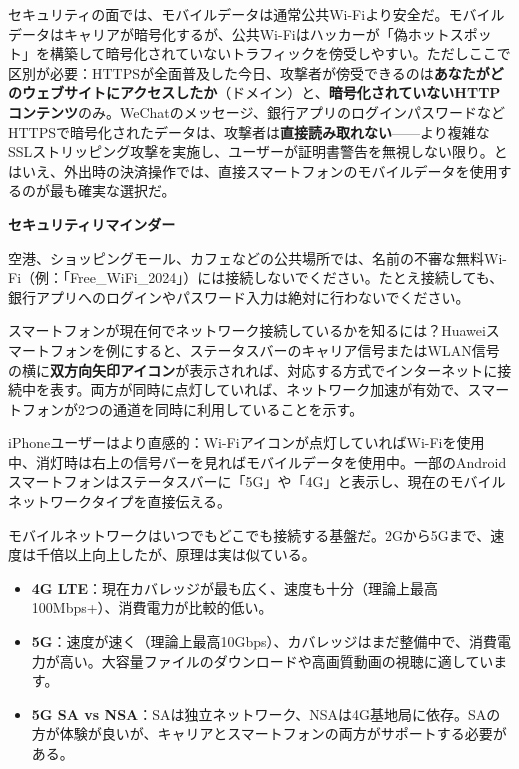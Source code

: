 
セキュリティの面では、モバイルデータは通常公共Wi-Fiより安全だ。モバイルデータはキャリアが暗号化するが、公共Wi-Fiはハッカーが「偽ホットスポット」を構築して暗号化されていないトラフィックを傍受しやすい。ただしここで区別が必要：HTTPSが全面普及した今日、攻撃者が傍受できるのは\textbf{あなたがどのウェブサイトにアクセスしたか}（ドメイン）と、\textbf{暗号化されていないHTTPコンテンツ}のみ。WeChatのメッセージ、銀行アプリのログインパスワードなどHTTPSで暗号化されたデータは、攻撃者は\textbf{直接読み取れない}——より複雑なSSLストリッピング攻撃を実施し、ユーザーが証明書警告を無視しない限り。とはいえ、外出時の決済操作では、直接スマートフォンのモバイルデータを使用するのが最も確実な選択だ。

\textbf{セキュリティリマインダー}\par

空港、ショッピングモール、カフェなどの公共場所では、名前の不審な無料Wi-Fi（例：「Free\_WiFi\_2024」）には接続しないでください。たとえ接続しても、銀行アプリへのログインやパスワード入力は絶対に行わないでください。


スマートフォンが現在何でネットワーク接続しているかを知るには？Huaweiスマートフォンを例にすると、ステータスバーのキャリア信号またはWLAN信号の横に\textbf{双方向矢印アイコン}が表示されれば、対応する方式でインターネットに接続中を表す。両方が同時に点灯していれば、ネットワーク加速が有効で、スマートフォンが2つの通道を同時に利用していることを示す。

iPhoneユーザーはより直感的：Wi-Fiアイコンが点灯していればWi-Fiを使用中、消灯時は右上の信号バーを見ればモバイルデータを使用中。一部のAndroidスマートフォンはステータスバーに「5G」や「4G」と表示し、現在のモバイルネットワークタイプを直接伝える。


モバイルネットワークはいつでもどこでも接続する基盤だ。2Gから5Gまで、速度は千倍以上向上したが、原理は実は似ている。


\begin{itemize}
  \item \textbf{4G LTE}：現在カバレッジが最も広く、速度も十分（理論上最高100Mbps+）、消費電力が比較的低い。
  \item \textbf{5G}：速度が速く（理論上最高10Gbps）、カバレッジはまだ整備中で、消費電力が高い。大容量ファイルのダウンロードや高画質動画の視聴に適しています。
  \item \textbf{5G SA vs NSA}：SAは独立ネットワーク、NSAは4G基地局に依存。SAの方が体験が良いが、キャリアとスマートフォンの両方がサポートする必要がある。
\end{itemize}


